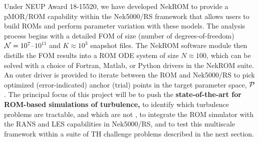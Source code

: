   Under NEUP Award 18-15520, we have developed NekROM to provide a pMOR/ROM
capability within the Nek5000/RS framework that allows users to build ROMs and
perform parameter variation with these models.  The analysis process begins
with a detailed FOM of size (number of degrees-of-freedom)
${\cal N}=10^7$--$10^{11}$ and $K \approx 10^3$ snapshot files.  The NekROM software
module then distills the FOM results into a ROM ODE system of size $N \approx
100$, which can be solved with a choice of Fortran, Matlab, or Python drivers
in the NekROM suite.  An outer driver is provided to iterate between the ROM
and Nek5000/RS to pick optimized (error-indicated) anchor (trial) points in the
target parameter space, $\mathcal{P}$.
  The principal focus of this project will be to push the \textbf{state-of-the-art
for ROM-based simulations of turbulence,} to identify which turbulence problems are
tractable, and which are not \cite{tsai22a}, to integrate the ROM simulator with
the RANS and LES capabilities in Nek5000/RS, and to test this multiscale 
framework within a suite of TH challenge problems described in the next section.



